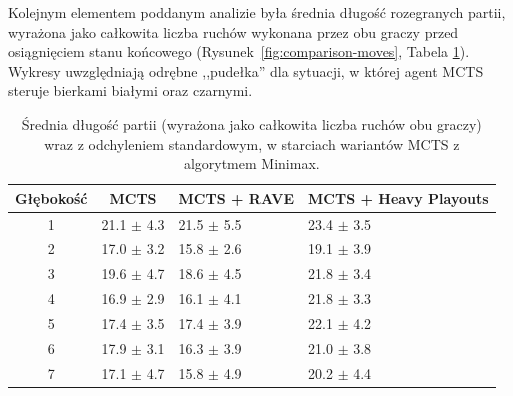 \documentclass{article}
\begin{document}
\noindent
Kolejnym elementem poddanym analizie była średnia długość rozegranych partii, wyrażona jako całkowita liczba ruchów wykonana przez obu graczy przed osiągnięciem stanu końcowego (Rysunek~\ref{fig:comparison-moves}, Tabela \ref{tab:comparison-game-length}). Wykresy uwzględniają odrębne ,,pudełka'' dla sytuacji, w której agent MCTS steruje bierkami białymi oraz czarnymi.

\begin{table}[H]
    \centering
    \caption{Średnia długość partii (wyrażona jako całkowita liczba ruchów obu graczy) wraz z odchyleniem standardowym, w starciach wariantów MCTS z algorytmem Minimax.}
    \label{tab:comparison-game-length}
    \renewcommand{\arraystretch}{1.2}

    \begin{tabular}{|c|c|p{1.6cm}|p{3cm}|}
        \hline
        \textbf{Głębokość} & \textbf{MCTS} & \textbf{MCTS + RAVE} & \textbf{MCTS + Heavy Playouts} \\
        \hline
        1 & \hfill 21.1 $\pm$ 4.3 & \hfill 21.5 $\pm$ 5.5 & \hfill 23.4 $\pm$ 3.5 \\
        2 & \hfill 17.0 $\pm$ 3.2 & \hfill 15.8 $\pm$ 2.6 & \hfill 19.1 $\pm$ 3.9 \\
        3 & \hfill 19.6 $\pm$ 4.7 & \hfill 18.6 $\pm$ 4.5 & \hfill 21.8 $\pm$ 3.4 \\
        4 & \hfill 16.9 $\pm$ 2.9 & \hfill 16.1 $\pm$ 4.1 & \hfill 21.8 $\pm$ 3.3 \\
        5 & \hfill 17.4 $\pm$ 3.5 & \hfill 17.4 $\pm$ 3.9 & \hfill 22.1 $\pm$ 4.2 \\
        6 & \hfill 17.9 $\pm$ 3.1 & \hfill 16.3 $\pm$ 3.9 & \hfill 21.0 $\pm$ 3.8 \\
        7 & \hfill 17.1 $\pm$ 4.7 & \hfill 15.8 $\pm$ 4.9 & \hfill 20.2 $\pm$ 4.4 \\
        \hline
    \end{tabular}
\end{table}
\end{document}
